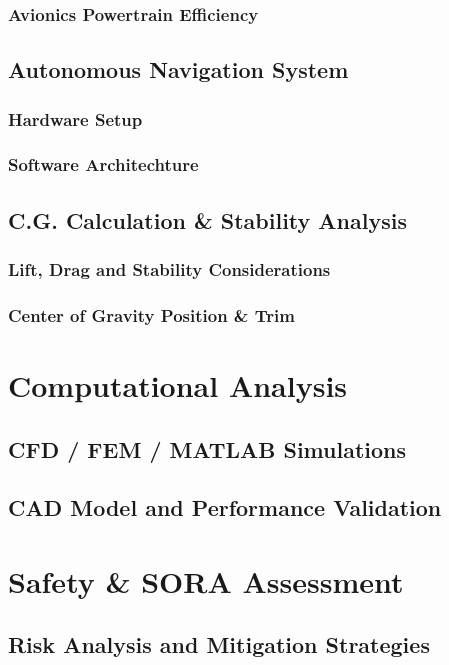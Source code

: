 \documentclass[12pt]{report}
\begin{document}
    \subsection{Avionics Powertrain Efficiency}

    \section{Autonomous Navigation System}
      \subsection{Hardware Setup}
      \subsection{Software Architechture}

    \section{C.G. Calculation \& Stability Analysis}
      \subsection{Lift, Drag and Stability Considerations}
      \subsection{Center of Gravity Position \& Trim}

  \chapter{Computational Analysis}
    \section{CFD / FEM / MATLAB Simulations}
    \section{CAD Model and Performance Validation}
  \chapter{Safety \& SORA Assessment}
    \section{Risk Analysis and Mitigation Strategies}
      
\end{document}
